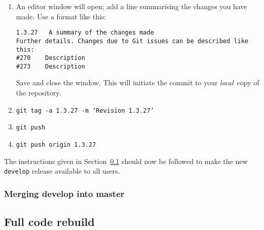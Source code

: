 \documentclass[11pt,a4paper]{report}
\begin{document}
\begin{enumerate}
\item An editor window will open; add a line summarising the changes you have made.  Use a format like this:
\begin{verbatim}
1.3.27   A summary of the changes made
Further details. Changes due to Git issues can be described like this:
#270    Description
#273    Description
\end{verbatim}
Save and close the window. This will initiate the commit to your \textit{local}\ copy of the repository.

\item \texttt{git tag -a 1.3.27 -m `Revision 1.3.27'}

\item \texttt{git push}

\item \texttt{git push origin 1.3.27}

\end{enumerate}

The instructions given in Section~\ref{sec:fullrebuild} should now be followed to make the new \texttt{develop} release available to all users.

\subsubsection{Merging develop into master}


\subsection{Full code rebuild}
\label{sec:fullrebuild}
\end{document}
